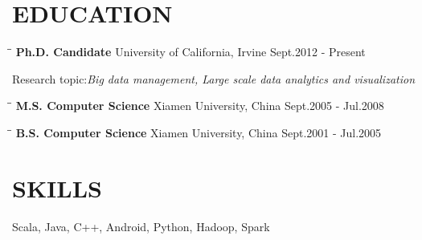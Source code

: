\documentclass{res}
\begin{document}
\begin{resume}
\section{EDUCATION}
   \vspace{-0.1in}
   \begin{tabbing}
  \hspace{2in}\= \hspace{3in}\= \kill %
    {\bf Ph.D. Candidate} \>  University of California, Irvine    \>Sept.2012 - Present\\
   \end{tabbing}\vspace{-30pt}      %
   Research topic:\emph{Big data management, Large scale data analytics and visualization }
   \vspace{-0.1in}
   \begin{tabbing}
   \hspace{2in}\= \hspace{3in}\= \kill %
    {\bf M.S. Computer Science} \>Xiamen University, China     \>Sept.2005 - Jul.2008\\
   \end{tabbing}\vspace{-30pt}      %
   \vspace{-0.1in}
   \begin{tabbing}
   \hspace{2in}\= \hspace{3in}\= \kill %
    {\bf B.S. Computer Science} \>Xiamen University, China     \>Sept.2001 - Jul.2005\\
   \end{tabbing}\vspace{-30pt}      %

\section{SKILLS}
    Scala, Java, C++, Android, Python, Hadoop, Spark


\end{resume}
\end{document}
